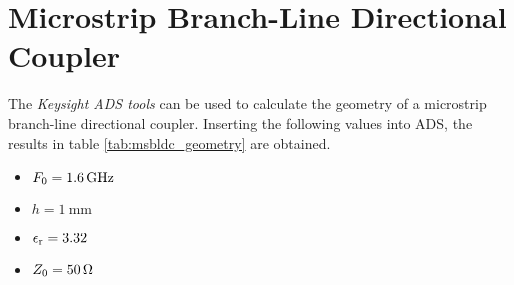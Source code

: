 \section{Microstrip Branch-Line Directional Coupler}
The \emph{Keysight ADS tools} can be used to calculate the geometry of a microstrip branch-line directional coupler.
Inserting the following values into ADS, the results in table \ref{tab:msbldc_geometry} are obtained.
\begin{itemize}
\item $F_{\rm 0} = \SI{1.6}{\giga\hertz}$
\item $h = \SI{1}{\milli\meter}$
\item $\epsilon_{\rm r} = 3.32$
\item $Z_{\rm 0} = \SI{50}{\ohm}$
\end{itemize}

\begin{table}


\end{table}